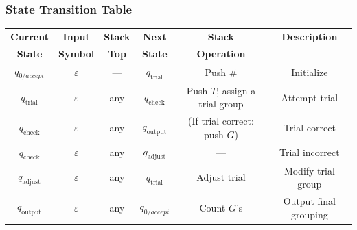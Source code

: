 \documentclass[11pt]{article}
\begin{document}
\subsubsection*{State Transition Table}
\begin{center}
\begin{tabular}{|c|c|c|c|c|c|}
\hline
\textbf{Current} & \textbf{Input} & \textbf{Stack } & \textbf{Next} & \textbf{Stack} &\textbf{Description}\\
\textbf{State} &  \textbf{Symbol} & \textbf{Top} & \textbf{State} & \textbf{Operation} &\\
\hline
\(q_{0/accept}\) & \(\varepsilon\) & --- & \(q_{\text{trial}}\) & Push \(\#\) & Initialize \\
\hline
\(q_{\text{trial}}\) & \(\varepsilon\) & any & \(q_{\text{check}}\) & Push \(T\); assign a trial group & Attempt trial \\
\hline
\(q_{\text{check}}\) & \(\varepsilon\) & any & \(q_{\text{output}}\) & (If trial correct: push \(G\)) & Trial correct \\
\hline
\(q_{\text{check}}\) & \(\varepsilon\) & any & \(q_{\text{adjust}}\) & --- & Trial incorrect \\
\hline
\(q_{\text{adjust}}\) & \(\varepsilon\) & any & \(q_{\text{trial}}\) & Adjust trial & Modify trial group \\
\hline
\(q_{\text{output}}\) & \(\varepsilon\) & any & \(q_{0/accept}\) & Count \(G\)'s & Output final grouping \\
\hline
\end{tabular}
\end{center}
\end{document}
